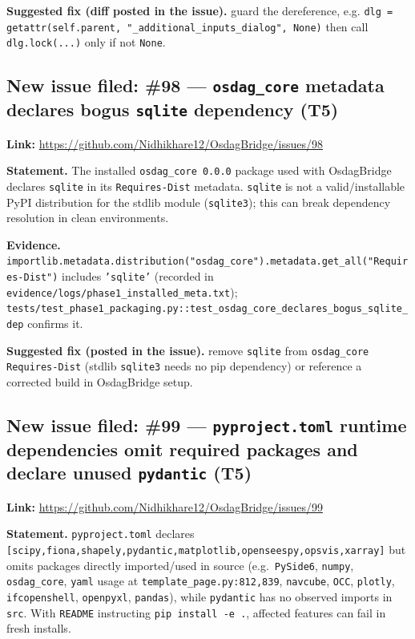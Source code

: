\documentclass[11pt,a4paper]{article}
\begin{document}
\textbf{Suggested fix (diff posted in the issue).} guard the dereference, e.g. \texttt{dlg = getattr(self.parent, "\_additional\_inputs\_dialog", None)} then call \texttt{dlg.lock(...)} only if not \texttt{None}.

\subsection{New issue filed: \#98 --- \texttt{osdag\_core} metadata declares bogus \texttt{sqlite} dependency (T5)}
\textbf{Link:} \url{https://github.com/Nidhikhare12/OsdagBridge/issues/98}

\textbf{Statement.} The installed \texttt{osdag\_core 0.0.0} package used with OsdagBridge declares \texttt{sqlite} in its \texttt{Requires-Dist} metadata. \texttt{sqlite} is not a valid/installable PyPI distribution for the stdlib module (\texttt{sqlite3}); this can break dependency resolution in clean environments.

\textbf{Evidence.} \texttt{importlib.metadata.distribution("osdag\_core").metadata.get\_all("Requires-Dist")} includes \texttt{'sqlite'} (recorded in \texttt{evidence/logs/phase1\_installed\_meta.txt}); \texttt{tests/test\_phase1\_packaging.py::test\_osdag\_core\_declares\_bogus\_sqlite\_dep} confirms it.

\textbf{Suggested fix (posted in the issue).} remove \texttt{sqlite} from \texttt{osdag\_core} \texttt{Requires-Dist} (stdlib \texttt{sqlite3} needs no pip dependency) or reference a corrected build in OsdagBridge setup.

\subsection{New issue filed: \#99 --- \texttt{pyproject.toml} runtime dependencies omit required packages and declare unused \texttt{pydantic} (T5)}
\textbf{Link:} \url{https://github.com/Nidhikhare12/OsdagBridge/issues/99}

\textbf{Statement.} \texttt{pyproject.toml} declares \texttt{[scipy,fiona,shapely,pydantic,matplotlib,openseespy,opsvis,xarray]} but omits packages directly imported/used in source (e.g.\ \texttt{PySide6}, \texttt{numpy}, \texttt{osdag\_core}, \texttt{yaml} usage at \texttt{template\_page.py:812,839}, \texttt{navcube}, \texttt{OCC}, \texttt{plotly}, \texttt{ifcopenshell}, \texttt{openpyxl}, \texttt{pandas}), while \texttt{pydantic} has no observed imports in \texttt{src}. With \texttt{README} instructing \texttt{pip install -e .}, affected features can fail in fresh installs.
\end{document}
